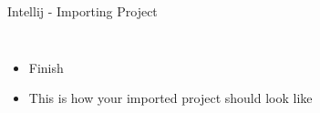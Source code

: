 \documentclass[aspectratio=1610,english]{beamer} %
\begin{document}
	\begin{frame}{Intellij - Importing Project}
		\begin{columns}
				\begin{itemize}
					\tiny
					\color{black}
					\item Finish
					\item This is how your imported project should look like
				\end{itemize}
				\fontsize{4}{5} \selectfont
		\end{columns}
	\end{frame}
\end{document}
